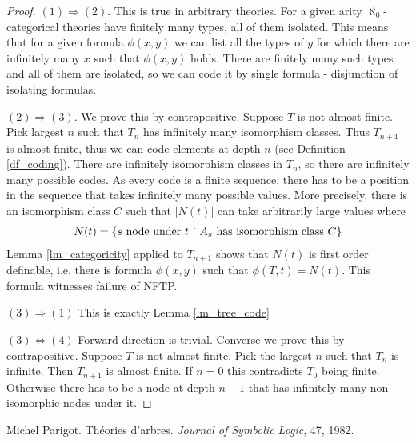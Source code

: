\documentclass{amsart}
\begin{document}
\begin{proof}
	$(1) \Rightarrow (2)$. This is true in arbitrary theories. For a given arity $\aleph_0$-categorical theories have finitely many types, all of them isolated. This means that for a given formula $\phi(x, y)$ we can list all the types of $y$ for which there are infinitely many $x$ such that $\phi(x, y)$ holds. There are finitely many such types and all of them are isolated, so we can code it by single formula - disjunction of isolating formulas.
	
	$(2) \Rightarrow (3)$. We prove this by contrapositive. Suppose $T$ is not almost finite. Pick largest $n$ such that $T_n$ has infinitely many isomorphism classes. Thus $T_{n+1}$ is almost finite, thus we can code elements at depth $n$ (see Definition \ref{df_coding}). There are infinitely isomorphism classes in $T_n$, so there are infinitely many possible codes. As every code is a finite sequence, there has to be a position in the sequence that takes infinitely many possible values. More precisely, there is an isomorphism class $C$ such that $|N(t)|$ can take arbitrarily large values where
	\begin{align*}
		N(t) = \{s \text{ node under $t$} \upharpoonright A_s \text { has isomorphism class $C$} \}
	\end{align*}
	Lemma \ref{lm_categoricity} applied to $T_{n+1}$ shows that $N(t)$ is first order definable, i.e. there is formula $\phi(x, y)$ such that $\phi(T, t) = N(t)$. This formula witnesses failure of NFTP.
	
	$(3) \Rightarrow (1)$ This is exactly Lemma \ref{lm_tree_code} %
	
	$(3) \Leftrightarrow (4)$ Forward direction is trivial. Converse we prove this by contrapositive. Suppose $T$ is not almost finite. Pick the largest $n$ such that $T_n$ is infinite. Then $T_{n+1}$ is almost finite. If $n=0$ this contradicts $T_0$ being finite. Otherwise there has to be a node at depth $n-1$ that has infinitely many non-isomorphic nodes under it. 
\end{proof}

\begin{thebibliography}{9}

	Michel Parigot.
	Th\'eories d'arbres.
	\textit{Journal of Symbolic Logic}, 47, 1982.
	
\end{thebibliography}
\end{document}
